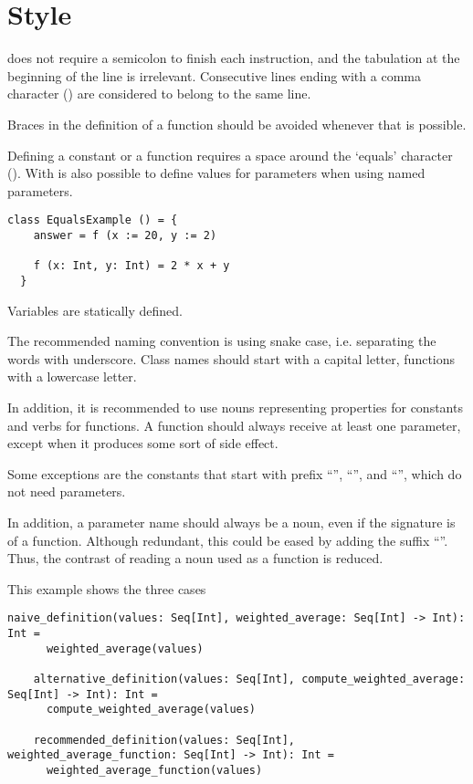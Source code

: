 \section{Style}

\Soda does not require a semicolon to finish each instruction, and the tabulation at the beginning of the line is irrelevant.
Consecutive lines ending with a comma character (\srccode{,}) are considered to belong to the same line.

Braces in the definition of a function should be avoided whenever that is possible.

Defining a constant or a function requires a space around the `equals' character (\sdef).
With \sdefparam is also possible to define values for parameters when using named parameters.

\begin{lstlisting}[label={lst:exampleFunctionWithoutBraces}]
  class EqualsExample () = {
    answer = f (x := 20, y := 2)

    f (x: Int, y: Int) = 2 * x + y
  }
\end{lstlisting}


Variables are statically defined.

The recommended naming convention is using snake case, i.e. separating the words with underscore.
Class names should start with a capital letter, functions with a lowercase letter.

In addition, it is recommended to use nouns representing properties for constants and verbs for functions.
A function should always receive at least one parameter, except when it produces some sort of side effect.

Some exceptions are the constants that start with prefix ``'', ``'', and ``'', which do not need parameters.

In addition, a parameter name should always be a noun, even if the signature is of a function.
Although redundant, this could be eased by adding the suffix ``''.
Thus, the contrast of reading a noun used as a function is reduced.

This example shows the three cases

\begin{lstlisting}[label={lst:exampleFunctionsAsParameter}]
    naive_definition(values: Seq[Int], weighted_average: Seq[Int] -> Int): Int =
      weighted_average(values)

    alternative_definition(values: Seq[Int], compute_weighted_average: Seq[Int] -> Int): Int =
      compute_weighted_average(values)

    recommended_definition(values: Seq[Int], weighted_average_function: Seq[Int] -> Int): Int =
      weighted_average_function(values)
\end{lstlisting}

